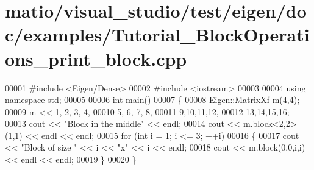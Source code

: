 \hypertarget{matio_2visual__studio_2test_2eigen_2doc_2examples_2_tutorial___block_operations__print__block_8cpp_source}{}\section{matio/visual\+\_\+studio/test/eigen/doc/examples/\+Tutorial\+\_\+\+Block\+Operations\+\_\+print\+\_\+block.cpp}
\label{matio_2visual__studio_2test_2eigen_2doc_2examples_2_tutorial___block_operations__print__block_8cpp_source}

\begin{DoxyCode}
00001 \textcolor{preprocessor}{#include <Eigen/Dense>}
00002 \textcolor{preprocessor}{#include <iostream>}
00003 
00004 \textcolor{keyword}{using namespace }\hyperlink{namespacestd}{std};
00005 
00006 \textcolor{keywordtype}{int} main()
00007 \{
00008   Eigen::MatrixXf m(4,4);
00009   m <<  1, 2, 3, 4,
00010         5, 6, 7, 8,
00011         9,10,11,12,
00012        13,14,15,16;
00013   cout << \textcolor{stringliteral}{"Block in the middle"} << endl;
00014   cout << m.block<2,2>(1,1) << endl << endl;
00015   \textcolor{keywordflow}{for} (\textcolor{keywordtype}{int} i = 1; i <= 3; ++i)
00016   \{
00017     cout << \textcolor{stringliteral}{"Block of size "} << i << \textcolor{stringliteral}{"x"} << i << endl;
00018     cout << m.block(0,0,i,i) << endl << endl;
00019   \}
00020 \}
\end{DoxyCode}
